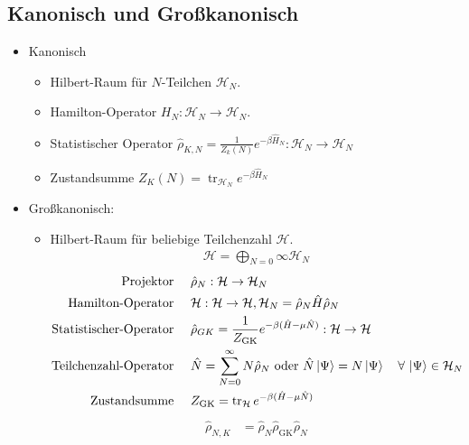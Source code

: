 \documentclass[11pt]{article}
\theoremstyle{plain}
\newcommand{\trace}{\operatorname{tr}}
\begin{document}
\subsection*{Kanonisch und Gro\ss{}kanonisch}
\begin{itemize}
  \item Kanonisch 
    \begin{itemize}
      \item Hilbert-Raum f\"ur $N$-Teilchen $\mathcal{H}_N$.
      \item Hamilton-Operator $H_N: \mathcal{H}_N \to \mathcal{H}_N$.
      \item Statistischer Operator $\hat{\rho}_{K, N} = \frac{1}{Z_k(N)} 
        e^{-\beta \hat{H}_N} : \mathcal{H}_N \to \mathcal{H}_N$
      \item Zustandsumme $Z_K(N) = \trace_{\mathcal{H}_N} e ^{-\beta \hat{H}_N}$
    \end{itemize}
  \item Gro\ss{}kanonisch:
    \begin{itemize}
      \item Hilbert-Raum f\"ur beliebige Teilchenzahl $\mathcal{H}$.
        \begin{align*}
          \mathcal{H} = \bigoplus_{N=0}{\infty} \mathcal{H}_N
        \end{align*}
        \begin{align*}
           \text{Projektor } &&&  \hat{\rho}_N : \mathcal{H} \to \mathcal{H}_N \\
           \text{Hamilton-Operator } &&&  \mathcal{H}: \mathcal{H} \to \mathcal{H},
          \mathcal{H}_N = \hat{\rho}_N \hat{H} \hat{\rho}_N \\
           \text{Statistischer-Operator } &&&
          \hat{\rho}_{GK} = \frac{1}{Z_{\text{GK}}} e^{-\beta (\hat{H} - 
          \mu \hat{N})}: \mathcal{H}\to \mathcal{H} \\
           \text{Teilchenzahl-Operator } &&&  \hat{N} = \sum_{N=0}^{\infty} N
          \hat{\rho}_N \text{ oder } \hat{N} \Ket{\Psi} = N \Ket{\Psi}
          \quad\forall\, \Ket{\Psi} \in \mathcal{H}_N \\
           \text{Zustandsumme } &&&  Z_{\text{GK}} = \trace_{\mathcal{H}} 
          e^{- \beta (\hat{H} - \mu \hat{N})}
        \end{align*}
        \begin{align*}
          \hat{\rho}_{N, K}& = \hat{\rho}_N \hat{\rho}_{\text{GK}} \hat{\rho}_N

\end{align*}
\end{itemize}
\end{itemize}
\end{document}
